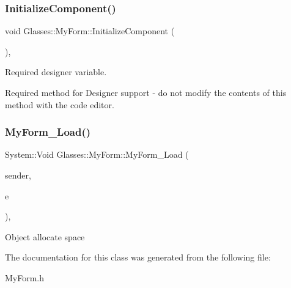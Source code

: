 \subsubsection{\texorpdfstring{Initialize\+Component()}{InitializeComponent()}}
{\footnotesize\ttfamily void Glasses\+::\+My\+Form\+::\+Initialize\+Component (\begin{DoxyParamCaption}\item[{void}]{ }\end{DoxyParamCaption})\hspace{0.3cm}{\ttfamily [inline]}, {\ttfamily [private]}}



Required designer variable. 

Required method for Designer support -\/ do not modify the contents of this method with the code editor. \mbox{\label{class_glasses_1_1_my_form_a9416887089d9934b8f015f3373d85047}} 
\subsubsection{\texorpdfstring{My\+Form\+\_\+\+Load()}{MyForm\_Load()}}
{\footnotesize\ttfamily System\+::\+Void Glasses\+::\+My\+Form\+::\+My\+Form\+\_\+\+Load (\begin{DoxyParamCaption}\item[{System\+::\+Object$^\wedge$}]{sender,  }\item[{System\+::\+Event\+Args$^\wedge$}]{e }\end{DoxyParamCaption})\hspace{0.3cm}{\ttfamily [inline]}, {\ttfamily [private]}}

Object allocate space 

The documentation for this class was generated from the following file\+:\begin{DoxyCompactItemize}
\item 
My\+Form.\+h\end{DoxyCompactItemize}
